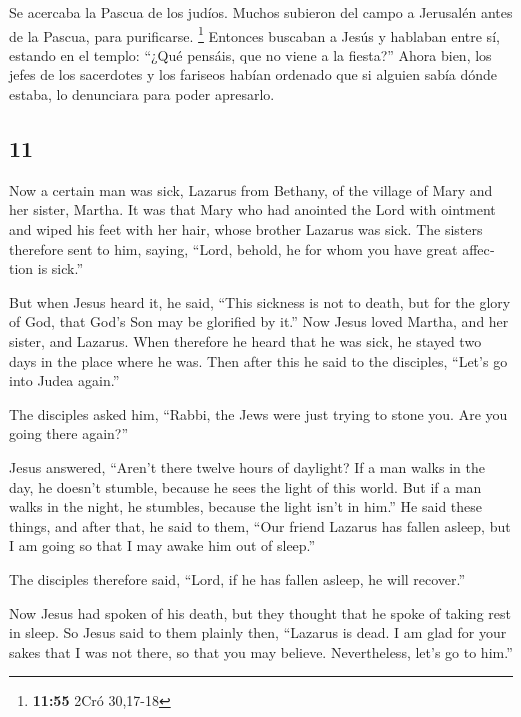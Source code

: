 \begin{paracol}{2}
 Se acercaba la Pascua de los judíos. Muchos subieron del
campo a Jerusalén antes de la Pascua, para purificarse. \footnote{\textbf{11:55}
  2Cró 30,17-18}  Entonces buscaban a Jesús y hablaban
entre sí, estando en el templo: ``¿Qué pensáis, que no viene a la
fiesta?''  Ahora bien, los jefes de los sacerdotes y los
fariseos habían ordenado que si alguien sabía dónde estaba, lo
denunciara para poder apresarlo.

\switchcolumn
\begin{otherlanguage}{english}

\hypertarget{section-21}{%
\section{11}\label{section-21}}

 Now a certain man was sick, Lazarus from Bethany, of the
village of Mary and her sister, Martha.  It was that Mary
who had anointed the Lord with ointment and wiped his feet with her
hair, whose brother Lazarus was sick.  The sisters
therefore sent to him, saying, ``Lord, behold, he for whom you have
great affection is sick.''

 But when Jesus heard it, he said, ``This sickness is not
to death, but for the glory of God, that God's Son may be glorified by
it.''  Now Jesus loved Martha, and her sister, and
Lazarus.  When therefore he heard that he was sick, he
stayed two days in the place where he was.  Then after
this he said to the disciples, ``Let's go into Judea again.''

 The disciples asked him, ``Rabbi, the Jews were just
trying to stone you. Are you going there again?''

 Jesus answered, ``Aren't there twelve hours of daylight?
If a man walks in the day, he doesn't stumble, because he sees the light
of this world.  But if a man walks in the night, he
stumbles, because the light isn't in him.''  He said
these things, and after that, he said to them, ``Our friend Lazarus has
fallen asleep, but I am going so that I may awake him out of sleep.''

 The disciples therefore said, ``Lord, if he has fallen
asleep, he will recover.''

 Now Jesus had spoken of his death, but they thought that
he spoke of taking rest in sleep.  So Jesus said to them
plainly then, ``Lazarus is dead.  I am glad for your
sakes that I was not there, so that you may believe. Nevertheless, let's
go to him.''


\end{otherlanguage}
\end{paracol}
